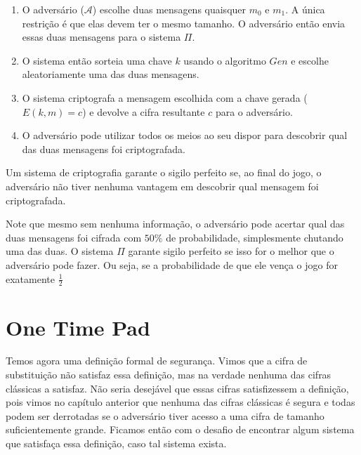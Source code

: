 \begin{enumerate}
\item O adversário ($\mathcal{A}$) escolhe duas mensagens quaisquer $m_0$ e $m_1$.
  A única restrição é que elas devem ter o mesmo tamanho.
  O adversário então envia essas duas mensagens para o sistema $\Pi$.
\item O sistema então sorteia uma chave $k$ usando o algoritmo $Gen$ e escolhe aleatoriamente uma das duas mensagens.
\item O sistema criptografa a mensagem escolhida com a chave gerada  ($E(k,m) = c$) e devolve a cifra resultante $c$ para o adversário.
\item O adversário pode utilizar todos os meios ao seu dispor para descobrir qual das duas mensagens foi criptografada.
\end{enumerate}

Um sistema de criptografia garante o sigilo perfeito se, ao final do jogo, o adversário não tiver nenhuma vantagem em descobrir qual mensagem foi criptografada.

\begin{center}
\end{center}

Note que mesmo sem nenhuma informação, o adversário pode acertar qual das duas mensagens foi cifrada com $50\%$ de probabilidade, simplesmente chutando uma das duas.
O sistema $\Pi$ garante sigilo perfeito se isso for o melhor que o adversário pode fazer.
Ou seja, se a probabilidade de que ele vença o jogo for exatamente $\frac{1}{2}$


\section{One Time Pad}
\label{sec:otp}

Temos agora uma definição formal de segurança.
Vimos que a cifra de substituição não satisfaz essa definição, mas na verdade nenhuma das cifras clássicas a satisfaz.
Não seria desejável que essas cifras satisfizessem a definição, pois vimos no capítulo anterior que nenhuma das cifras clássicas é segura e todas podem ser derrotadas se o adversário tiver acesso a uma cifra de tamanho suficientemente grande.
Ficamos então com o desafio de encontrar algum sistema que satisfaça essa definição, caso tal sistema exista.

